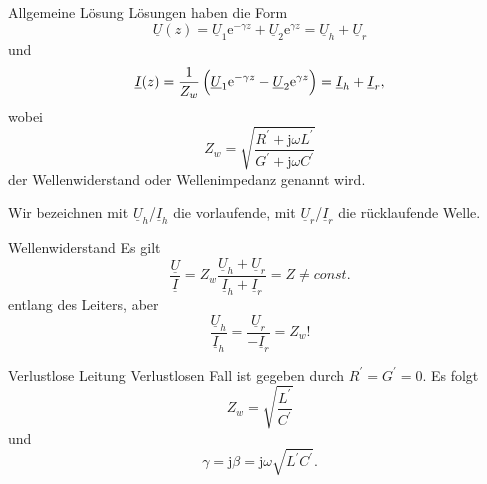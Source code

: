 \documentclass{beamer}
\begin{document}
\begin{frame}{Allgemeine Lösung}
    Lösungen haben die Form
    \begin{equation}
        \underline{U}(z) = \underline{U}_{1} \mathrm{e}^{- \gamma z}
        +
        \underline{U}_{2} \mathrm{e}^{\gamma z}
        = \underline{U}_{h} + \underline{U}_{r} \label{eq:VerlustU}
    \end{equation}
    und
    \begin{equation}
        \underline{I}(z) = \frac{1}{Z_{w}} \left( \vphantom{\sqrt{1}{Z}}
        \underline{U}_{1} \mathrm{e}^{- \gamma z} - \underline{U}_{2} \mathrm{e}^{\gamma z} \right)
        = \underline{I}_{h} + \underline{I}_{r}, \label{eq:VerlustI}
    \end{equation}
    wobei
    \begin{equation}
        Z_{w} = \sqrt{\frac{R^{\prime} + \mathrm{j} \omega L^{\prime}}{G^{\prime} + \mathrm{j} \omega C^{\prime}}}
        \label{eq:Zw}
    \end{equation}
    der Wellenwiderstand oder Wellenimpedanz genannt wird.


    Wir bezeichnen mit $\underline{U}_{h}$/$\underline{I}_{h}$ die \alert{vorlaufende}, mit
    $\underline{U}_{r}$/$\underline{I}_{r}$ die \alert{rücklaufende} Welle.
\end{frame}


\begin{frame}{Wellenwiderstand}
Es gilt
\begin{equation*}
    \frac{\underline{U}}{\underline{I}} =
     Z_{w} \frac{\underline{U}_{h} + \underline{U}_{r}}{\underline{I}_{h} + \underline{I}_{r}} =
     Z \ne const.
\end{equation*}
entlang des Leiters, aber
\[ \frac{\underline{U}_{h}}{\underline{I}_{h}} = \frac{\underline{U}_{r}}{- \underline{I}_{r}} = Z_{w}! \]

\end{frame}



\begin{frame}{Verlustlose Leitung}
Verlustlosen Fall ist gegeben durch \mbox{$R^{\prime} = G^{\prime} = 0$}.
Es folgt
\[
Z_{w} = \sqrt{\frac{L^{\prime}}{C^{\prime}}}
\]
und
\[
\gamma = \mathrm{j} \beta = \mathrm{j} \omega \sqrt{L^{\prime} C^{\prime}}.
\]
\end{frame}
\end{document}
